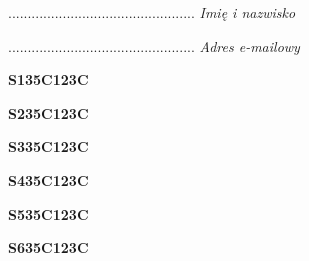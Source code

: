 \begin{turn}{90}\begin{minipage}{\linewidth} \vspace{20mm} ................................................  \textit{Imię i nazwisko}\end{minipage}\end{turn}

\begin{turn}{90}\begin{minipage}{\linewidth} \vspace{20mm} ................................................  \textit{Adres e-mailowy}\end{minipage}\end{turn}

\begin{turn}{90}\huge \begin{minipage}{\linewidth} \vspace{10mm}\textbf{S135C123C}\end{minipage}\end{turn}

\begin{turn}{90}\huge \begin{minipage}{\linewidth} \vspace{10mm}\textbf{S235C123C}\end{minipage}\end{turn}

\begin{turn}{90}\huge \begin{minipage}{\linewidth} \vspace{10mm}\textbf{S335C123C}\end{minipage}\end{turn}

\begin{turn}{90}\huge \begin{minipage}{\linewidth} \vspace{10mm}\textbf{S435C123C}\end{minipage}\end{turn}

\begin{turn}{90}\huge \begin{minipage}{\linewidth} \vspace{10mm}\textbf{S535C123C}\end{minipage}\end{turn}

\begin{turn}{90}\huge \begin{minipage}{\linewidth} \vspace{10mm}\textbf{S635C123C}\end{minipage}\end{turn}

